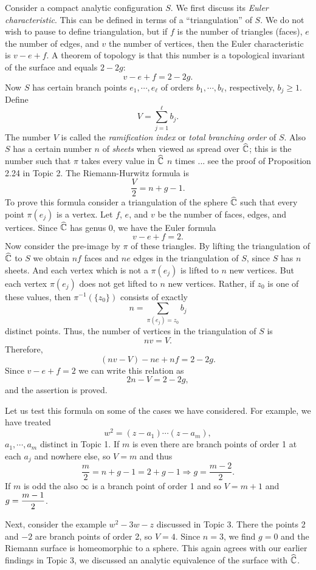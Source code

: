 \documentclass[a4paper,11pt]{article}
\begin{document}
Consider a compact analytic configuration $S$.  We first discuss its
\emph{Euler characteristic}.  This can be defined in terms of a
``triangulation'' of $S$.  We do not wish to pause to define
triangulation, but if $f$ is the number of triangles (faces), $e$ the
number of edges, and $v$ the number of vertices, then the Euler
characteristic is $v-e+f$.  A theorem of topology is that this number
is a topological invariant of the surface and equals $2-2g$:
$$
v - e + f = 2-2g.
$$
Now $S$ has certain branch points $e_1, \cdots, e_\ell$ of orders
$b_1, \cdots, b_\ell$, respectively, $b_j \ge 1$.  Define
$$
V = \sum_{j=1}^{\ell} b_j.
$$
The number $V$ is called the \emph{ramification index} or \emph{total
  branching order} of $S$.  Also $S$ has a certain number $n$ of
\emph{sheets} when viewed as spread over $\widehat{{\mathbb C}}$; this is the
number such that $\pi$ takes every value in $\widehat{{\mathbb C}}$ $n$ times
... see the proof of Proposition 2.24 in Topic 2.  The Riemann-Hurwitz 
formula is
$$
\boxed{
\frac{V}{2} = n + g - 1.
}
$$
To prove this formula consider a triangulation of the sphere
$\widehat{{\mathbb C}}$ such that every point $\pi(e_j)$ is a vertex.  Let
$f$, $e$, and $v$ be the number of faces, edges, and vertices.  Since
$\widehat{{\mathbb C}}$ has genus 0, we have the Euler formula
$$
v - e + f = 2.
$$
Now consider the pre-image by $\pi$ of these triangles.  By lifting
the triangulation of $\widehat{{\mathbb C}}$ to $S$ we obtain $nf$ faces and
$ne$ edges in the triangulation of $S$, since $S$ has $n$ sheets.  And
each vertex which is not a $\pi(e_j)$ is lifted to $n$ new
vertices.  But each vertex $\pi(e_j)$ does not get lifted to $n$ new
vertices.  Rather, if $z_0$ is one of these values, then
$\pi^{-1}(\{z_0\})$ consists of exactly
$$
n = \sum_{\pi(e_j)=z_0} b_j
$$
distinct points.  Thus, the number of vertices in the triangulation of
$S$ is 
$$
nv = V.
$$
Therefore,
$$
(nv-V) - ne + nf = 2-2g.
$$
Since $v-e+f = 2$ we can write this relation as
$$
2n - V = 2-2g,
$$
and the assertion is proved.

Let us test this formula on some of the cases we have considered.  For
example, we have treated
$$
w^2 = (z-a_1) \cdots (z-a_m),
$$
$a_1, \cdots, a_m$ distinct in Topic 1.  If $m$ is even there are
branch points of order 1 at each $a_j$ and nowhere else, so $V = m$
and thus
$$
\frac{m}{2} = n + g - 1 = 2 + g - 1
\Rightarrow g = \frac{m-2}{2}.
$$
If $m$ is odd the also $\infty$ is a branch point of order 1 and so $V
= m+1$ and $\displaystyle g = \frac{m-1}{2}$.

Next, consider the example $w^2 - 3w - z$ discussed in Topic 3.
There the points 2 and $-2$ are branch points of order 2, so $V = 4$.
Since $n = 3$, we find $g = 0$ and the Riemann surface is homeomorphic
to a sphere.  This again agrees with our earlier findings in Topic
3, we discussed an analytic equivalence of the surface with
$\widehat{{\mathbb C}}$.
\end{document}
